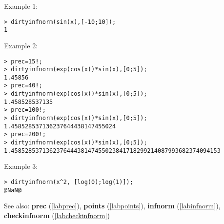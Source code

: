 \noindent Example 1: 
\begin{center}\begin{minipage}{15cm}\begin{Verbatim}[frame=single]
> dirtyinfnorm(sin(x),[-10;10]);
1
\end{Verbatim}
\end{minipage}\end{center}
\noindent Example 2: 
\begin{center}\begin{minipage}{15cm}\begin{Verbatim}[frame=single]
> prec=15!;
> dirtyinfnorm(exp(cos(x))*sin(x),[0;5]);
1.45856
> prec=40!;
> dirtyinfnorm(exp(cos(x))*sin(x),[0;5]);
1.458528537135
> prec=100!;
> dirtyinfnorm(exp(cos(x))*sin(x),[0;5]);
1.458528537136237644438147455024
> prec=200!;
> dirtyinfnorm(exp(cos(x))*sin(x),[0;5]);
1.458528537136237644438147455023841718299214087993682374094153
\end{Verbatim}
\end{minipage}\end{center}
\noindent Example 3: 
\begin{center}\begin{minipage}{15cm}\begin{Verbatim}[frame=single]
> dirtyinfnorm(x^2, [log(0);log(1)]);
@NaN@
\end{Verbatim}
\end{minipage}\end{center}
See also: \textbf{prec} (\ref{labprec}), \textbf{points} (\ref{labpoints}), \textbf{infnorm} (\ref{labinfnorm}), \textbf{checkinfnorm} (\ref{labcheckinfnorm})
